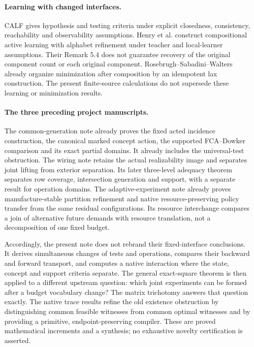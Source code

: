 \paragraph{Learning with changed interfaces.}
CALF \cite[Theorems 16 and 20]{CALF} gives hypothesis and testing
criteria under explicit closedness, consistency, reachability and
observability assumptions. Henry et al. \cite[Theorem 5.3]{CoalA}
construct compositional active learning with alphabet refinement under
teacher and local-learner assumptions. Their Remark 5.4 does not guarantee
recovery of the original component count or each original component.
Rosebrugh--Sabadini--Walters \cite[Propositions 43 and 46,
Corollary 47]{MinimalRealization} already organize minimization after
composition by an idempotent lax construction. The present finite-source
calculations do not supersede these learning or minimization results.

\paragraph{The three preceding project manuscripts.}
The common-generation note \cite{Common} already proves the fixed acted
incidence construction, the canonical marked concept action, the supported
FCA--Dowker comparison and its exact partial domains. It already includes
the universal-test obstruction. The wiring note \cite{Wiring} retains
the actual realizability image and separates joint lifting from exterior
separation. Its later three-level adequacy theorem separates row coverage,
intersection generation and support, with a separate result for operation
domains. The adaptive-experiment note \cite{Adaptive} already proves
manufacture-stable partition refinement and native resource-preserving
policy transfer from the same residual configurations. Its resource
interchange compares a join of alternative future demands with resource
translation, not a decomposition of one fixed budget.

Accordingly, the present note does not rebrand their fixed-interface
conclusions. It derives simultaneous changes of tests and operations,
compares their backward and forward transport, and computes a native
interaction where the state, concept and support criteria separate.
The general exact-square theorem is then applied to a different upstream
question: which joint experiments can be formed after a budget vocabulary
change? The matrix trichotomy answers that question exactly. The native
trace results refine the old existence obstruction by distinguishing
common feasible witnesses from common optimal witnesses and by providing
a primitive, endpoint-preserving compiler. These are proved mathematical
increments and a synthesis; no exhaustive novelty certification is asserted.

